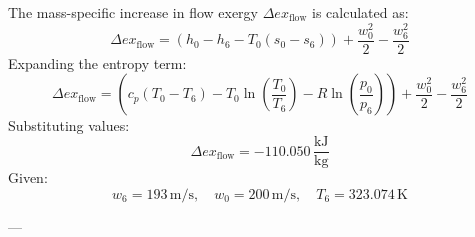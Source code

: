 The mass-specific increase in flow exergy \( \Delta ex_{\text{flow}} \) is calculated as:  
\[
\Delta ex_{\text{flow}} = (h_0 - h_6 - T_0(s_0 - s_6)) + \frac{w_0^2}{2} - \frac{w_6^2}{2}
\]  
Expanding the entropy term:  
\[
\Delta ex_{\text{flow}} = (c_p(T_0 - T_6) - T_0 \ln\left(\frac{T_0}{T_6}\right) - R \ln\left(\frac{p_0}{p_6}\right)) + \frac{w_0^2}{2} - \frac{w_6^2}{2}
\]  
Substituting values:  
\[
\Delta ex_{\text{flow}} = -110.050 \, \frac{\text{kJ}}{\text{kg}}
\]  
Given:  
\[
w_6 = 193 \, \text{m/s}, \quad w_0 = 200 \, \text{m/s}, \quad T_6 = 323.074 \, \text{K}
\]  

---